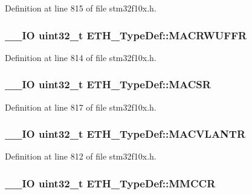 Definition at line 815 of file stm32f10x.\-h.

\hypertarget{struct_e_t_h___type_def_a8cd8da723ca1469d767de1334e16ec9d}{
\subsubsection[{M\-A\-C\-R\-W\-U\-F\-F\-R}]{\setlength{\rightskip}{0pt plus 5cm}\-\_\-\-\_\-\-I\-O {\bf uint32\-\_\-t} E\-T\-H\-\_\-\-Type\-Def\-::\-M\-A\-C\-R\-W\-U\-F\-F\-R}}\label{struct_e_t_h___type_def_a8cd8da723ca1469d767de1334e16ec9d}


Definition at line 814 of file stm32f10x.\-h.

\hypertarget{struct_e_t_h___type_def_a9bee2fa58555f6725fc14a8d42484d42}{
\subsubsection[{M\-A\-C\-S\-R}]{\setlength{\rightskip}{0pt plus 5cm}\-\_\-\-\_\-\-I\-O {\bf uint32\-\_\-t} E\-T\-H\-\_\-\-Type\-Def\-::\-M\-A\-C\-S\-R}}\label{struct_e_t_h___type_def_a9bee2fa58555f6725fc14a8d42484d42}


Definition at line 817 of file stm32f10x.\-h.

\hypertarget{struct_e_t_h___type_def_a0792c8c170502e3466518d200ca297c3}{
\subsubsection[{M\-A\-C\-V\-L\-A\-N\-T\-R}]{\setlength{\rightskip}{0pt plus 5cm}\-\_\-\-\_\-\-I\-O {\bf uint32\-\_\-t} E\-T\-H\-\_\-\-Type\-Def\-::\-M\-A\-C\-V\-L\-A\-N\-T\-R}}\label{struct_e_t_h___type_def_a0792c8c170502e3466518d200ca297c3}


Definition at line 812 of file stm32f10x.\-h.

\hypertarget{struct_e_t_h___type_def_a530d6551e73b9b616d8dc23a53e29708}{
\subsubsection[{M\-M\-C\-C\-R}]{\setlength{\rightskip}{0pt plus 5cm}\-\_\-\-\_\-\-I\-O {\bf uint32\-\_\-t} E\-T\-H\-\_\-\-Type\-Def\-::\-M\-M\-C\-C\-R}}\label{struct_e_t_h___type_def_a530d6551e73b9b616d8dc23a53e29708}


